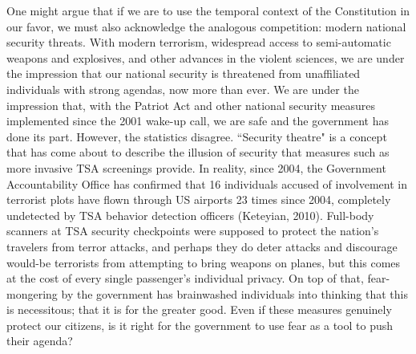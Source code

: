 \documentclass[12pt]{article}
\begin{document}
\begin{flushleft}
    \par One might argue that if we are to use the temporal context of the 
    Constitution in our favor, we must also acknowledge the analogous 
    competition: modern national security threats. With modern terrorism, 
    widespread access to semi-automatic weapons and explosives, and other 
    advances in the violent sciences, we are under the impression that our national 
    security is threatened from unaffiliated individuals with strong agendas, 
    now more than ever. We are under the impression that, with the Patriot Act 
    and other national security measures implemented since the 2001 wake-up 
    call, we are safe and the government has done its part. However, the 
    statistics disagree. ``Security theatre" is a concept that has come about to 
    describe the illusion of security that measures such as more invasive TSA 
    screenings provide. In reality, since 2004, the Government Accountability 
    Office has confirmed that 16 individuals accused of involvement in terrorist 
    plots have flown through US airports 23 times since 2004, completely 
    undetected by TSA behavior detection officers (Keteyian, 2010).
    Full-body scanners at TSA security checkpoints were supposed to protect the 
    nation's travelers from terror attacks, and perhaps they do deter attacks 
    and discourage would-be terrorists from attempting to bring weapons on 
    planes, but this comes at the cost of every single passenger's individual 
    privacy. On top of that, fear-mongering by the government has brainwashed 
    individuals into thinking that this is necessitous; that it is for the 
    greater good. Even if these measures genuinely protect our citizens, is it 
    right for the government to use fear as a tool to push their agenda?
    

\end{flushleft}
\end{document}
